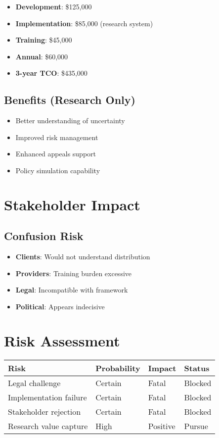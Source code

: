 \begin{itemize}
    \item \textbf{Development}: \$125,000
    \item \textbf{Implementation}: \$85,000 (research system)
    \item \textbf{Training}: \$45,000
    \item \textbf{Annual}: \$60,000
    \item \textbf{3-year TCO}: \$435,000
\end{itemize}

\subsection{Benefits (Research Only)}

\begin{itemize}
    \item Better understanding of uncertainty
    \item Improved risk management
    \item Enhanced appeals support
    \item Policy simulation capability
\end{itemize}

\section{Stakeholder Impact}

\subsection{Confusion Risk}

\begin{itemize}
    \item \textbf{Clients}: Would not understand distribution
    \item \textbf{Providers}: Training burden excessive
    \item \textbf{Legal}: Incompatible with framework
    \item \textbf{Political}: Appears indecisive
\end{itemize}

\section{Risk Assessment}

\begin{center}
\begin{tabular}{llll}
\toprule
Risk & Probability & Impact & Status \\
\midrule
Legal challenge & Certain & Fatal & Blocked \\
Implementation failure & Certain & Fatal & Blocked \\
Stakeholder rejection & Certain & Fatal & Blocked \\
Research value capture & High & Positive & Pursue \\
\bottomrule
\end{tabular}
\end{center}


